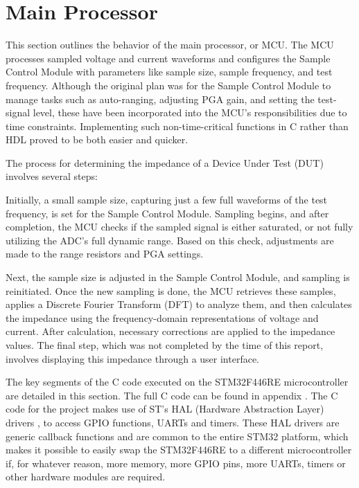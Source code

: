 \section{Main Processor} \label{sec:MCU}

This section outlines the behavior of the main processor, or MCU. The MCU processes sampled voltage and current waveforms and configures the Sample Control Module with parameters like sample size, sample frequency, and test frequency. Although the original plan was for the Sample Control Module to manage tasks such as auto-ranging, adjusting PGA gain, and setting the test-signal level, these have been incorporated into the MCU's responsibilities due to time constraints. Implementing such non-time-critical functions in C rather than HDL proved to be both easier and quicker.

The process for determining the impedance of a Device Under Test (DUT) involves several steps:

Initially, a small sample size, capturing just a few full waveforms of the test frequency, is set for the Sample Control Module. Sampling begins, and after completion, the MCU checks if the sampled signal is either saturated, or not fully utilizing the ADC's full dynamic range. Based on this check, adjustments are made to the range resistors and PGA settings. 

Next, the sample size is adjusted in the Sample Control Module, and sampling is reinitiated. Once the new sampling is done, the MCU retrieves these samples, applies a Discrete Fourier Transform (DFT) to analyze them, and then calculates the impedance using the frequency-domain representations of voltage and current. After calculation, necessary corrections are applied to the impedance values. The final step, which was not completed by the time of this report, involves displaying this impedance through a user interface.

The key segments of the C code executed on the STM32F446RE microcontroller are detailed in this section. The full C code can be found in appendix . The C code for the project makes use of ST's HAL (Hardware Abstraction Layer) drivers \cite{STHAL}, to access GPIO functions, UARTs and timers. These HAL drivers are generic callback functions and are common to the entire STM32 platform, which makes it possible to easily swap the STM32F446RE to a different microcontroller if, for whatever reason, more memory, more GPIO pins, more UARTs, timers or other hardware modules are required. 

